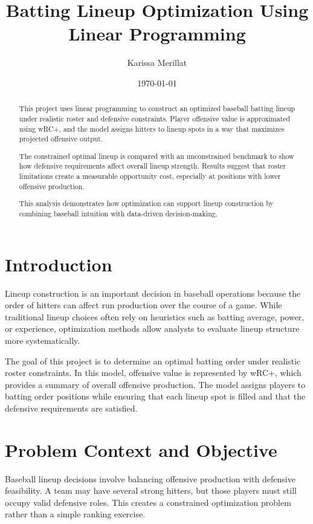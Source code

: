 \documentclass[12pt]{article}
\title{Batting Lineup Optimization Using Linear Programming}
\author{Karissa Merillat}
\date{\today}
\begin{document}
\maketitle
\doublespacing

\begin{abstract}
This project uses linear programming to construct an optimized baseball batting lineup under realistic roster and defensive constraints. Player offensive value is approximated using wRC+, and the model assigns hitters to lineup spots in a way that maximizes projected offensive output.

The constrained optimal lineup is compared with an unconstrained benchmark to show how defensive requirements affect overall lineup strength. Results suggest that roster limitations create a measurable opportunity cost, especially at positions with lower offensive production.

This analysis demonstrates how optimization can support lineup construction by combining baseball intuition with data-driven decision-making.
\end{abstract}

\section{Introduction}

Lineup construction is an important decision in baseball operations because the order of hitters can affect run production over the course of a game. While traditional lineup choices often rely on heuristics such as batting average, power, or experience, optimization methods allow analysts to evaluate lineup structure more systematically.

The goal of this project is to determine an optimal batting order under realistic roster constraints. In this model, offensive value is represented by wRC+, which provides a summary of overall offensive production. The model assigns players to batting order positions while ensuring that each lineup spot is filled and that the defensive requirements are satisfied.

\section{Problem Context and Objective}

Baseball lineup decisions involve balancing offensive production with defensive feasibility. A team may have several strong hitters, but those players must still occupy valid defensive roles. This creates a constrained optimization problem rather than a simple ranking exercise.
\end{document}
